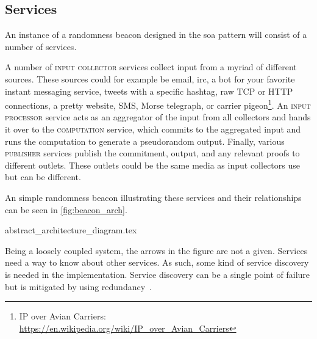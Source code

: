 \subsection{Services}%
\label{sub:components_of_a_beacon}

An instance of a randomness beacon designed in the \gls{soa} pattern will consist of a number of services.

A number of \textsc{input collector} services collect input from a myriad of different sources. These sources could for example be email, irc, a bot for your favorite instant messaging service, tweets with a specific hashtag, raw TCP or HTTP connections, a pretty website, SMS, Morse telegraph, or carrier pigeon\footnote{IP over Avian Carriers: \url{https://en.wikipedia.org/wiki/IP_over_Avian_Carriers}}.
An \textsc{input processor} service acts as an aggregator of the input from all collectors and hands it over to the \textsc{computation} service, which commits to the aggregated input and runs the computation to generate a pseudorandom output.
Finally, various \textsc{publisher} services publish the commitment, output, and any relevant proofs to different outlets. These outlets could be the same media as input collectors use but can be different.

An simple randomness beacon illustrating these services and their relationships can be seen in \cref{fig:beacon_arch}.

{abstract_architecture_diagram.tex}

Being a loosely coupled system, the arrows in the figure are not a given. Services need a way to know about other services. As such, some kind of service discovery is needed in the implementation. Service discovery can be a single point of failure but is mitigated by using redundancy~\cite{soa_redundancy}.
